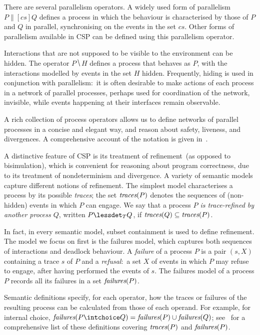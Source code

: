 \documentclass[3p,times]{elsarticle}
\newcommand{\trc}{\text{\it traces}}
\newcommand{\fails}{\text{\it failures}}
\begin{document}
There are several parallelism operators. A widely used form of parallelism $P
\parallel[cs] Q$ defines a process in which the behaviour is characterised by
those of $P$ and $Q$ in parallel, synchronising on the events in the set
$cs$. Other forms of parallelism available in CSP can be defined using this
parallelism operator.

Interactions that are not supposed to be visible to the environment can be
hidden. The operator $P \hide H$ defines a process that behaves as $P$, with
the interactions modelled by events in the set $H$ hidden. Frequently, hiding
is used in conjunction with parallelism:~it is often desirable to make
actions of each process in a network of parallel processes, perhaps used for
coordination of the network, invisible, while events happening at their
interfaces remain observable.

A rich collection of process operators allows us to define networks of
parallel processes in a concise and elegant way, and reason about safety,
liveness, and divergences.  A comprehensive account of the notation is given
in~\cite{Roscoe2010}.

A distinctive feature of CSP is its treatment of refinement~(as opposed to
bisimulation), which is convenient for reasoning about program correctness,
due to its treatment of nondeterminism and divergence.  A variety of semantic
models capture different notions of refinement. The simplest model
characterises a process by its possible \emph{traces}; the set $\trc(P)$
denotes the sequences of (non-hidden) events in which $P$ can engage.  We say
that a process \emph{$P$ is trace-refined by another process $Q$}, written $P
\lessdet_T Q$, if $\trc(Q)\subseteq \trc(P)$.

In fact, in every semantic model, subset containment is used to define refinement. The
model we focus on first is the failures model, which captures both
sequences of interactions and deadlock behaviour. A \emph{failure} of a process $P$
is a pair $(s,X)$ containing a trace $s$ of $P$ and a \emph{refusal}:~a set $X$ of
events in which $P$ may refuse to engage, after having performed the events of
$s$. The failures model of a process $P$ records all its failures in a set
$\fails(P)$.

Semantic definitions specify, for each operator, how the traces or failures
of the resulting process can be calculated from those of each operand. For
example, for internal choice, $\fails(P\intchoice Q) =
\fails(P)\cup\fails(Q)$; see~\cite[p.~210]{Roscoe:1997:TPC:550448} for a
comprehensive list of these definitions covering $\trc(P)$ and $\fails(P)$.
\end{document}
